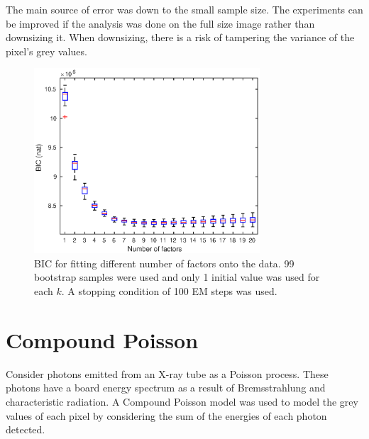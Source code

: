 \documentclass[12pt]{report}
\begin{document}
The main source of error was down to the small sample size. The experiments can be improved if the analysis was done on the full size image rather than downsizing it. When downsizing, there is a risk of tampering the variance of the pixel's grey values.

\begin{figure}
	\centering
	\includegraphics[width=0.75\textwidth]{figures/initial_factor_BIC_bootstrap.eps}
	\caption{BIC for fitting different number of factors onto the data. 99 bootstrap samples were used and only 1 initial value was used for each $k$. A stopping condition of 100 EM steps was used.}
	\label{fig:initial_factor_BIC_bootstrap}
\end{figure}

\section{Compound Poisson}
Consider photons emitted from an X-ray tube as a Poisson process. These photons have a board energy spectrum as a result of Bremsstrahlung and characteristic radiation. A Compound Poisson model was used to model the grey values of each pixel by considering the sum of the energies of each photon detected.
\end{document}
